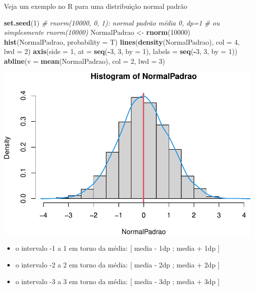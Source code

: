 \documentclass[
]{book}
\newenvironment{Shaded}{\begin{snugshade}}{\end{snugshade}}
\newcommand{\AttributeTok}[1]{\textcolor[rgb]{0.13,0.29,0.53}{#1}}
\newcommand{\CommentTok}[1]{\textcolor[rgb]{0.56,0.35,0.01}{\textit{#1}}}
\newcommand{\DecValTok}[1]{\textcolor[rgb]{0.00,0.00,0.81}{#1}}
\newcommand{\FunctionTok}[1]{\textcolor[rgb]{0.13,0.29,0.53}{\textbf{#1}}}
\newcommand{\NormalTok}[1]{#1}
\newcommand{\OtherTok}[1]{\textcolor[rgb]{0.56,0.35,0.01}{#1}}
\newcommand{\SpecialCharTok}[1]{\textcolor[rgb]{0.81,0.36,0.00}{\textbf{#1}}}
\begin{document}
Veja um exemplo no R para uma distribuição normal padrão

\begin{Shaded}
\begin{Highlighting}[]
\FunctionTok{set.seed}\NormalTok{(}\DecValTok{1}\NormalTok{)}
\CommentTok{\# rnorm(10000, 0, 1): normal padrão média 0, dp=1}
\CommentTok{\# ou simplesmente rnorm(10000)}
\NormalTok{NormalPadrao }\OtherTok{\textless{}{-}} \FunctionTok{rnorm}\NormalTok{(}\DecValTok{10000}\NormalTok{)}
\FunctionTok{hist}\NormalTok{(NormalPadrao, }\AttributeTok{probability =}\NormalTok{ T)}
\FunctionTok{lines}\NormalTok{(}\FunctionTok{density}\NormalTok{(NormalPadrao), }\AttributeTok{col =} \DecValTok{4}\NormalTok{, }\AttributeTok{lwd =} \DecValTok{2}\NormalTok{)}
\FunctionTok{axis}\NormalTok{(}\AttributeTok{side =} \DecValTok{1}\NormalTok{, }\AttributeTok{at =} \FunctionTok{seq}\NormalTok{(}\SpecialCharTok{{-}}\DecValTok{3}\NormalTok{, }\DecValTok{3}\NormalTok{, }\AttributeTok{by =} \DecValTok{1}\NormalTok{), }\AttributeTok{labels =} \FunctionTok{seq}\NormalTok{(}\SpecialCharTok{{-}}\DecValTok{3}\NormalTok{, }\DecValTok{3}\NormalTok{, }\AttributeTok{by =} \DecValTok{1}\NormalTok{))}
\FunctionTok{abline}\NormalTok{(}\AttributeTok{v =} \FunctionTok{mean}\NormalTok{(NormalPadrao), }\AttributeTok{col =} \DecValTok{2}\NormalTok{, }\AttributeTok{lwd =} \DecValTok{3}\NormalTok{)}
\end{Highlighting}
\end{Shaded}

\includegraphics{Livro-Estatistica+R_files/figure-latex/unnamed-chunk-32-1.pdf}

\begin{itemize}
\item
  o intervalo -1 a 1 em torno da média: {[} media - 1dp ; media + 1dp {]}
\item
  o intervalo -2 a 2 em torno da média: {[} media - 2dp ; media + 2dp {]}
\item
  o intervalo -3 a 3 em torno da média: {[} media - 3dp ; media + 3dp {]}
\end{itemize}
\end{document}
